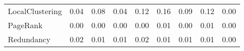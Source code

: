 \begin{table}
{{\begin{tabular}{|p{40mm}|ccc|ccccc|}
                  LocalClustering &                   {\small 0.04} &                  {\small 0.08} &                  {\small 0.04} &                     {\small 0.12} &                   {\small 0.16} &                     {\small 0.09} &                     {\small 0.12} &                     {\small 0.00} \\
                         PageRank &                   {\small 0.00} &                  {\small 0.00} &                  {\small 0.00} &                     {\small 0.00} &                   {\small 0.01} &                     {\small 0.00} &                     {\small 0.01} &                     {\small 0.00} \\
                       Redundancy &                   {\small 0.02} &                  {\small 0.01} &                  {\small 0.01} &                     {\small 0.02} &                   {\small 0.01} &                     {\small 0.01} &                     {\small 0.01} &                     {\small 0.00} \\
\bottomrule
\end{tabular}
}
}\end{table}
